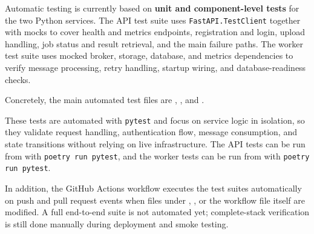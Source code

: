 \documentclass{scrartcl}
\begin{document}



Automatic testing is currently based on \textbf{unit and component-level tests} for the two Python services. The API test suite uses \texttt{FastAPI.TestClient} together with mocks to cover health and metrics endpoints, registration and login, upload handling, job status and result retrieval, and the main failure paths. The worker test suite uses mocked broker, storage, database, and metrics dependencies to verify message processing, retry handling, startup wiring, and database-readiness checks.

Concretely, the main automated test files are , , and .

These tests are automated with \texttt{pytest} and focus on service logic in isolation, so they validate request handling, authentication flow, message consumption, and state transitions without relying on live infrastructure. The API tests can be run from  with \texttt{poetry run pytest}, and the worker tests can be run from  with \texttt{poetry run pytest}.

In addition, the GitHub Actions workflow  executes the test suites automatically on push and pull request events when files under , , or the workflow file itself are modified. A full end-to-end suite is not automated yet; complete-stack verification is still done manually during deployment and smoke testing.
\end{document}
